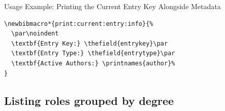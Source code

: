 \documentclass[12pt, twoside]{article}
\begin{document}
Usage Example: Printing the Current Entry Key Alongside Metadata
\begin{lstlisting}[style=latexExampleForAuthors, escapechar=|, basicstyle=\footnotesize, caption={{Print current entry key with metadata}}, label=lst:biberPrintCurrentEntry]
\newbibmacro*{print:current:entry:info}{%
  \par\noindent
  \textbf{Entry Key:} \thefield{entrykey}\par
  \textbf{Entry Type:} \thefield{entrytype}\par
  \textbf{Active Authors:} \printnames{author}%
}
\end{lstlisting}

\subsection{Listing roles grouped by degree}
\end{document}
